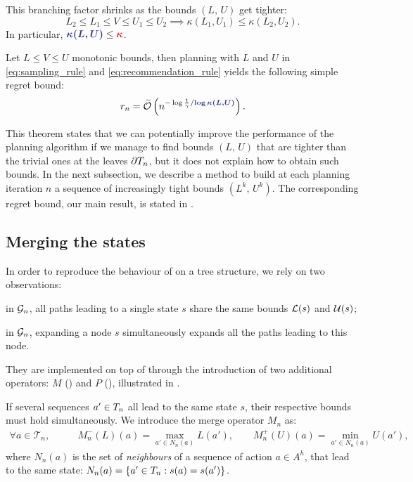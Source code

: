 \documentclass[runningheads]{llncs}
\begin{document}
\begin{lemma}
\label{lem:shrink}
This branching factor shrinks as the bounds $(L,\,U)$ get tighter:
\[L_2\leq L_1\leq V\leq U_1\leq U_2\implies \kappa(L_1,U_1) \leq \kappa(L_2,U_2).\]
In particular, $\hlbb{\kappa(L,U)} \leq \hlrb{\kappa}$.
\end{lemma}

\begin{theorem}
\label{thm:regret-bound-U}
Let $L \leq V\leq U$ monotonic bounds, then planning with $L$ and $U$ in \eqref{eq:sampling_rule} and \eqref{eq:recommendation_rule} yields the following simple regret bound:
\begin{equation*}
r_n = \tilde{\cO}\left(n^{-\log \frac{1}{\gamma}/\hlbb{\log \kappa(L,U)}}\right).
\end{equation*}
\end{theorem}


This theorem states that we can potentially improve the performance of the planning algorithm if we manage to find bounds $(L,\, U)$ that are tighter than the trivial ones at the leaves ${\partial T_n}$, but it does not explain how to obtain such bounds. In the next subsection, we describe a method to build at each planning iteration $n$ a sequence of increasingly tight bounds $(L^k,\, U^k)$. The corresponding regret bound, our main result, is stated in .


\subsection{Merging the states}

In order to reproduce the behaviour of  on a tree structure, we rely on two observations: \begin{enumerate*}[label=(\roman*)]
	\item in $\mathcal{G}_n$, all paths leading to a single state $s$ share the same bounds $\mathcal{L}(s)$ and $\mathcal{U}(s)$;
	\item in $\mathcal{G}_n$, expanding a node $s$ simultaneously expands all the paths leading to this node.
\end{enumerate*}
They are implemented on top of  through the introduction of two additional operators: $M$ () and $P$ (),  illustrated in .

\begin{definition}
	\label{def:merge}
If several sequences $a'\in T_n$ all lead to the same state $s$, their respective bounds must hold simultaneously. We introduce the merge operator $M_n$ as:
    \begin{align}
    \label{eq:merge}
        \forall a\in\mathcal{T}_n, \qquad &M_n^-(L)(a) = \max_{a'\in N_n(a)} L(a'),\qquad M_n^+(U)(a) = \min_{a'\in N_n(a)} U(a'),                                   
    \end{align}
    where $N_n(a)$ is the set of \emph{neighbours} of a sequence of action $a\in A^h$, that lead to the same state:  $N_n(a) = \{a'\in T_n: s(a)=s(a')\}$.
\end{definition}
\end{document}
